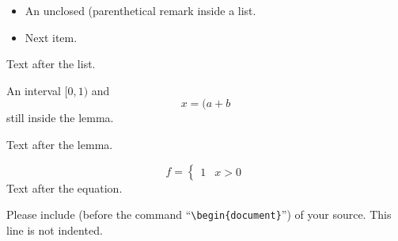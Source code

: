 \documentclass{article}
\begin{document}
\begin{itemize}
  \item An unclosed (parenthetical
      remark inside a list.
    \item Next item.
\end{itemize}
Text after the list.

\begin{lemma}
  An interval $[0,1)$ and
  \begin{equation}
    x = (a
      + b
  \end{equation}
  still inside the lemma.
\end{lemma}
Text after the lemma.

\begin{equation*}
  f = \left\{
    \begin{array}{ll}
      1 & x > 0
    \end{array}
  \right.
\end{equation*}
Text after the equation.

Please include (before the
command ``\verb|\begin{document}|'') of your source.
This line is not indented.
\end{document}
